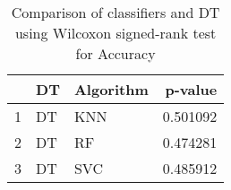 \begin{table}
\footnotesize
\caption{Comparison of classifiers and DT using Wilcoxon signed-rank test for Accuracy}
\label{tab:DT wilcoxon Accuracy comparison}
\begin{tabular}{lllr}
\hline
 & DT & Algorithm & p-value \\
\hline
1 & DT & KNN & 0.501092 \\
2 & DT & RF & 0.474281 \\
3 & DT & SVC & 0.485912 \\
\hline
\end{tabular}
\end{table}
